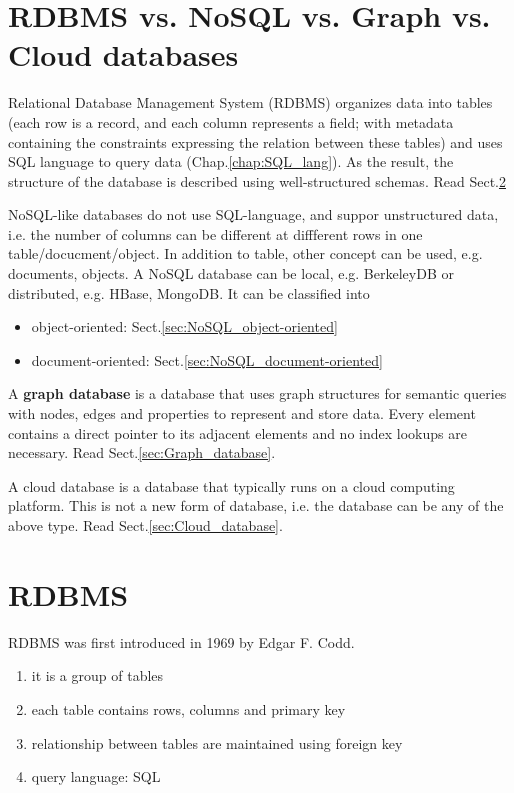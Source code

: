 \section{RDBMS vs. NoSQL vs. Graph vs. Cloud databases}
\label{sec:database_categories}

Relational Database Management System (RDBMS) organizes data into tables (each
row is a record, and each column represents a field; with metadata containing
the constraints expressing the relation between these tables) and uses SQL
language to query data (Chap.\ref{chap:SQL_lang}).
As the result, the structure of the database is described using well-structured
schemas. Read Sect.\ref{sec:RDBMS}

NoSQL-like databases do not use SQL-language, and suppor unstructured data, i.e.
the number of columns can be different at diffferent rows in one
table/docucment/object. In addition to table, other concept can be used, e.g.
documents, objects. A NoSQL database can be local, e.g. BerkeleyDB or
distributed, e.g. HBase, MongoDB. It can be classified into
\begin{itemize}
  \item object-oriented: Sect.\ref{sec:NoSQL_object-oriented}
  \item document-oriented: Sect.\ref{sec:NoSQL_document-oriented}
\end{itemize}

A {\bf graph database} is a database that uses graph structures for semantic
queries with nodes, edges and properties to represent and store data.
Every element contains a direct pointer to its adjacent elements and no index
lookups are necessary. Read Sect.\ref{sec:Graph_database}.


A cloud database is a database that typically runs on a cloud computing platform. 
This is not a new form of database, i.e. the database can be any of the above type. 
Read Sect.\ref{sec:Cloud_database}.

 


\section{RDBMS}
\label{sec:RDBMS}

RDBMS was first introduced in 1969 by Edgar F. Codd.
\begin{enumerate}
  \item it is a group of tables
  \item each table contains rows, columns and primary key
  \item relationship between tables are maintained using foreign key
  \item query language: SQL
\end{enumerate}

